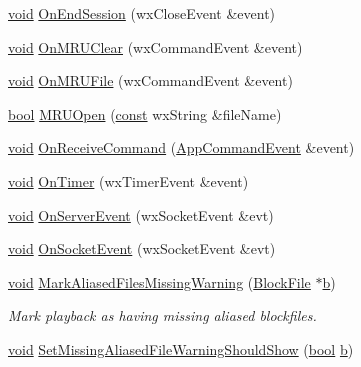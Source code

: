 \begin{DoxyCompactItemize}
\item 
\hyperlink{sound_8c_ae35f5844602719cf66324f4de2a658b3}{void} \hyperlink{class_audacity_app_a3e5c65ba02a6cb04a47dd74867f319d7}{On\+End\+Session} (wx\+Close\+Event \&event)
\item 
\hyperlink{sound_8c_ae35f5844602719cf66324f4de2a658b3}{void} \hyperlink{class_audacity_app_a92f396b6e8d2305ae1575efbde329fc3}{On\+M\+R\+U\+Clear} (wx\+Command\+Event \&event)
\item 
\hyperlink{sound_8c_ae35f5844602719cf66324f4de2a658b3}{void} \hyperlink{class_audacity_app_a74f1cd0f6953c14bda7cf03efab63c25}{On\+M\+R\+U\+File} (wx\+Command\+Event \&event)
\item 
\hyperlink{mac_2config_2i386_2lib-src_2libsoxr_2soxr-config_8h_abb452686968e48b67397da5f97445f5b}{bool} \hyperlink{class_audacity_app_ae89d2eb1091271ab1ebeb1752b668af1}{M\+R\+U\+Open} (\hyperlink{getopt1_8c_a2c212835823e3c54a8ab6d95c652660e}{const} wx\+String \&file\+Name)
\item 
\hyperlink{sound_8c_ae35f5844602719cf66324f4de2a658b3}{void} \hyperlink{class_audacity_app_ae6f0848bca594f34dc0bb9cacf536e07}{On\+Receive\+Command} (\hyperlink{class_app_command_event}{App\+Command\+Event} \&event)
\item 
\hyperlink{sound_8c_ae35f5844602719cf66324f4de2a658b3}{void} \hyperlink{class_audacity_app_a50a762ae7432f25eb067c9946456f76d}{On\+Timer} (wx\+Timer\+Event \&event)
\item 
\hyperlink{sound_8c_ae35f5844602719cf66324f4de2a658b3}{void} \hyperlink{class_audacity_app_a36209198478f212c72bddcc944914818}{On\+Server\+Event} (wx\+Socket\+Event \&evt)
\item 
\hyperlink{sound_8c_ae35f5844602719cf66324f4de2a658b3}{void} \hyperlink{class_audacity_app_af07c8411fcf1462e2373c2c3ba32b6a7}{On\+Socket\+Event} (wx\+Socket\+Event \&evt)
\item 
\hyperlink{sound_8c_ae35f5844602719cf66324f4de2a658b3}{void} \hyperlink{class_audacity_app_a05e03a9a9caa436a87a803a4eea19d51}{Mark\+Aliased\+Files\+Missing\+Warning} (\hyperlink{class_block_file}{Block\+File} $\ast$\hyperlink{convtest_8m_a21ad0bd836b90d08f4cf640b4c298e7c}{b})
\begin{DoxyCompactList}\small\item\em Mark playback as having missing aliased blockfiles. \end{DoxyCompactList}\item 
\hyperlink{sound_8c_ae35f5844602719cf66324f4de2a658b3}{void} \hyperlink{class_audacity_app_aeb08d650377a0607ac251da0293813a7}{Set\+Missing\+Aliased\+File\+Warning\+Should\+Show} (\hyperlink{mac_2config_2i386_2lib-src_2libsoxr_2soxr-config_8h_abb452686968e48b67397da5f97445f5b}{bool} \hyperlink{convtest_8m_a21ad0bd836b90d08f4cf640b4c298e7c}{b})

\end{DoxyCompactItemize}

